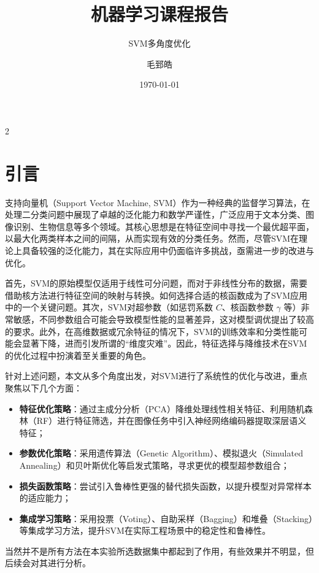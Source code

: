 \documentclass[twoside,dvipsnames]{CUGThesis}
\title{机器学习课程报告} %
\subtitle{SVM多角度优化}
\author{毛郅皓} %
\date{\today} %
\begin{document}
	\maketitle

	

	\makeToc

	
        \begin{spacing}{2}
		\section{引言}
	\end{spacing}


支持向量机（Support Vector Machine, SVM）作为一种经典的监督学习算法，在处理二分类问题中展现了卓越的泛化能力和数学严谨性，广泛应用于文本分类、图像识别、生物信息等多个领域。其核心思想是在特征空间中寻找一个最优超平面，以最大化两类样本之间的间隔，从而实现有效的分类任务。然而，尽管SVM在理论上具备较强的泛化能力，其在实际应用中仍面临许多挑战，亟需进一步的改进与优化。

首先，SVM的原始模型仅适用于线性可分问题，而对于非线性分布的数据，需要借助核方法进行特征空间的映射与转换。如何选择合适的核函数成为了SVM应用中的一个关键问题。其次，SVM对超参数（如惩罚系数 \(C\)、核函数参数 \(\gamma\) 等）非常敏感，不同参数组合可能会导致模型性能的显著差异，这对模型调优提出了较高的要求。此外，在高维数据或冗余特征的情况下，SVM的训练效率和分类性能可能会显著下降，进而引发所谓的“维度灾难”。因此，特征选择与降维技术在SVM的优化过程中扮演着至关重要的角色。

针对上述问题，本文从多个角度出发，对SVM进行了系统性的优化与改进，重点聚焦以下几个方面：

\begin{itemize}
    \item \textbf{特征优化策略}：通过主成分分析（PCA）降维处理线性相关特征、利用随机森林（RF）进行特征筛选，并在图像任务中引入神经网络编码器提取深层语义特征；
    \item \textbf{参数优化策略}：采用遗传算法（Genetic Algorithm）、模拟退火（Simulated Annealing）和贝叶斯优化等启发式策略，寻求更优的模型超参数组合；
    \item \textbf{损失函数策略}：尝试引入鲁棒性更强的替代损失函数，以提升模型对异常样本的适应能力；
    \item \textbf{集成学习策略}：采用投票（Voting）、自助采样（Bagging）和堆叠（Stacking）等集成学习方法，提升SVM在实际工程场景中的稳定性和鲁棒性。
\end{itemize}
当然并不是所有方法在本实验所选数据集中都起到了作用，有些效果并不明显，但后续会对其进行分析。
\end{document}
